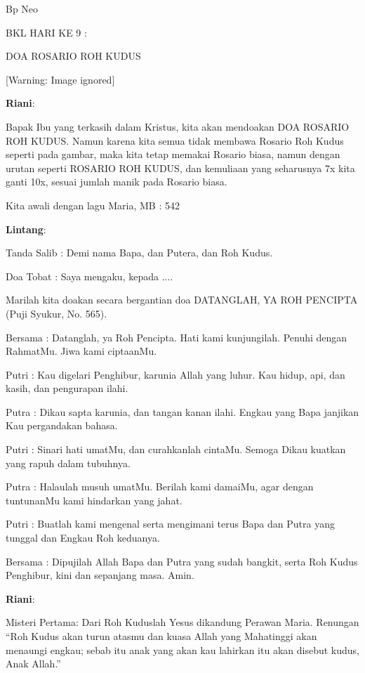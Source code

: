 \documentclass[12pt]{article}
\def\petugasA{\textbf{Riani}}
\def\petugasB{\textbf{Lintang}}
\begin{document}
Bp Neo

BKL HARI KE 9 : 

DOA ROSARIO ROH KUDUS

  [Warning: Image ignored] %
 

\petugasA:

Bapak Ibu yang terkasih dalam Kristus, kita akan mendoakan DOA ROSARIO
ROH KUDUS. Namun karena kita semua tidak membawa Rosario Roh Kudus
seperti pada gambar, maka kita tetap memakai Rosario biasa, namun
dengan urutan seperti ROSARIO ROH KUDUS, dan kemuliaan yang seharusnya
7x kita ganti 10x, sesuai jumlah manik pada Rosario biasa.

Kita awali dengan lagu Maria, MB : 542

\petugasB:

Tanda Salib : Demi nama Bapa, dan Putera, dan Roh Kudus.

Doa Tobat : Saya mengaku, kepada ....

Marilah kita doakan secara bergantian  doa  DATANGLAH, YA ROH PENCIPTA
(Puji Syukur, No. 565).

Bersama : Datanglah, ya Roh Pencipta. Hati kami kunjungilah. Penuhi
dengan RahmatMu. Jiwa kami ciptaanMu. 

Putri : Kau digelari Penghibur, karunia Allah yang luhur. Kau hidup,
api, dan kasih, dan pengurapan ilahi. 

Putra : Dikau sapta karunia, dan tangan kanan ilahi. Engkau yang Bapa
janjikan Kau pergandakan bahasa.

Putri : Sinari hati umatMu, dan curahkanlah cintaMu. Semoga Dikau
kuatkan yang rapuh dalam tubuhnya.

Putra : Halaulah musuh umatMu. Berilah kami damaiMu, agar dengan
tuntunanMu kami hindarkan yang jahat. 

Putri : Buatlah kami mengenal serta mengimani terus Bapa dan Putra yang
tunggal dan Engkau Roh keduanya. 

Bersama : Dipujilah Allah Bapa dan Putra yang sudah bangkit, serta Roh
Kudus Penghibur, kini dan sepanjang masa. Amin. 

\petugasA:

Misteri Pertama: {\textquotedbl}Dari Roh Kuduslah Yesus dikandung
Perawan Maria.{\textquotedbl} Renungan  {\textquotedblleft}Roh Kudus
akan turun atasmu dan kuasa Allah yang Mahatinggi akan menaungi engkau;
sebab itu anak yang akan kau lahirkan itu akan disebut kudus, Anak
Allah.{\textquotedblright}
\end{document}
